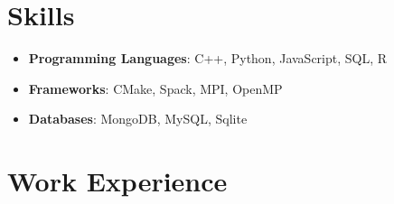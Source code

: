 \documentclass[letterpaper,11pt]{article}
\begin{document}
\section{Skills}
\begin{itemize}[leftmargin=0.0in, label={}]
  \item \textbf{Programming Languages}: C++, Python, JavaScript, SQL, R
  \item \textbf{Frameworks}: CMake, Spack, MPI, OpenMP
  \item \textbf{Databases}: MongoDB, MySQL, Sqlite
\end{itemize}

\section{Work Experience}
\end{document}
